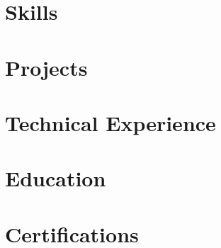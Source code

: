 \documentclass[letter,10pt]{article}
\begin{document}
\thispagestyle{firstpage}



\section{Skills}


\section{Projects}


\section{Technical Experience}


\section{Education}


\section{Certifications}


\end{document}
